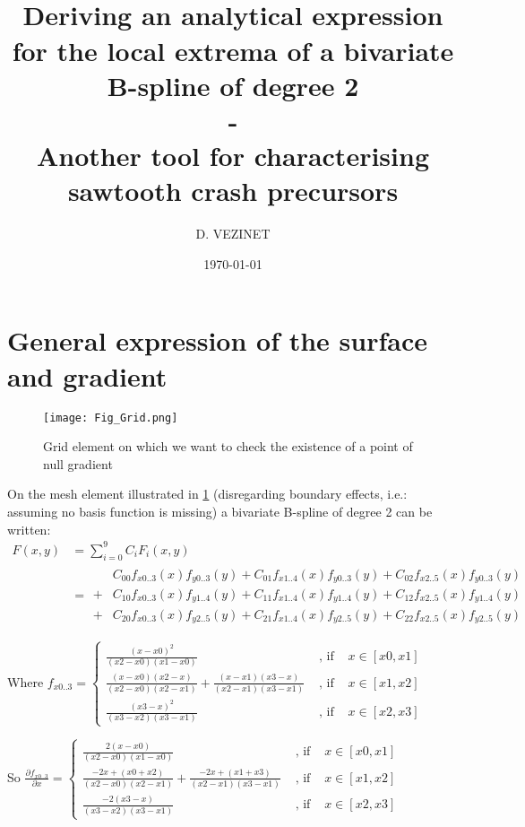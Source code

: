 \documentclass[paper=a4, fontsize=11pt]{scrartcl}
\title{
		\usefont{OT1}{bch}{b}{n}
		\horrule{0.5pt} \\[0.2cm]
		\LARGE Deriving an analytical expression for the local extrema of a bivariate B-spline of degree 2\\
        -\\
        \normalsize Another tool for characterising sawtooth crash precursors
		\horrule{2pt} \\[0.3cm]
}
\author{D. VEZINET}
\date{\today}
\numberwithin{equation}{section}		%
\numberwithin{figure}{section}			%
\numberwithin{table}{section}				%
\begin{document}
\maketitle

\tableofcontents

\newpage
\section{General expression of the surface and gradient}


\begin{figure}[hbtp]
    \centering
    \texttt{[image: Fig\_Grid.png]}
    \caption{\small Grid element on which we want to check the existence of a point of null gradient}
    \label{Fig:Grid}
\end{figure}


On the mesh element illustrated in \ref{Fig:Grid} (disregarding boundary effects, i.e.: assuming no basis function is missing) a bivariate B-spline of degree 2 can be written:
$$
\begin{array}{ll}
F(x,y) &= \sum_{i=0}^{9}C_{i}F_i(x,y)\\
&=
\begin{array}{ll}
& C_{00}f_{x0..3}(x)f_{y0..3}(y) + C_{01}f_{x1..4}(x)f_{y0..3}(y) + C_{02}f_{x2..5}(x)f_{y0..3}(y)\\
+& C_{10}f_{x0..3}(x)f_{y1..4}(y) + C_{11}f_{x1..4}(x)f_{y1..4}(y) + C_{12}f_{x2..5}(x)f_{y1..4}(y)\\
+& C_{20}f_{x0..3}(x)f_{y2..5}(y) + C_{21}f_{x1..4}(x)f_{y2..5}(y) + C_{22}f_{x2..5}(x)f_{y2..5}(y)
\end{array}
\end{array}
$$

Where $f_{x0..3} =
\left\{
\begin{array}{lll}
\frac{(x-x0)^2}{(x2-x0)(x1-x0)} & \text{ ,  if  } & x \in [x0,x1]\\
\frac{(x-x0)(x2-x)}{(x2-x0)(x2-x1)} + \frac{(x-x1)(x3-x)}{(x2-x1)(x3-x1)} & \text{ ,  if  } & x \in [x1,x2]\\
\frac{(x3-x)^2}{(x3-x2)(x3-x1)} & \text{ ,  if  } & x \in [x2,x3]
\end{array}
\right.
$

So $\frac{\partial f_{x0..3}}{\partial x} =
\left\{
\begin{array}{lll}
\frac{2(x-x0)}{(x2-x0)(x1-x0)} & \text{ ,  if  } & x \in [x0,x1]\\
\frac{-2x+(x0+x2)}{(x2-x0)(x2-x1)} + \frac{-2x+(x1+x3)}{(x2-x1)(x3-x1)} & \text{ ,  if  } & x \in [x1,x2]\\
\frac{-2(x3-x)}{(x3-x2)(x3-x1)} & \text{ ,  if  } & x \in [x2,x3]
\end{array}
\right.
$
\end{document}
